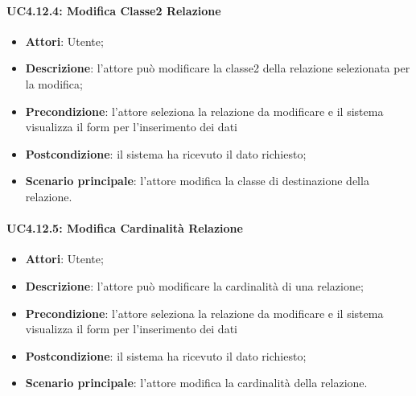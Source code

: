 \paragraph{UC4.12.4: Modifica Classe2 Relazione}
\label{UC4.12.4}
\begin{itemize}
	\item \textbf{Attori}: Utente;
	\item \textbf{Descrizione}: l'attore può modificare la classe2 della relazione selezionata per la modifica;
	\item \textbf{Precondizione}: l'attore seleziona la relazione da modificare e il sistema visualizza il form per l'inserimento dei dati
	\item \textbf{Postcondizione}: il sistema ha ricevuto il dato richiesto;
	\item \textbf{Scenario principale}: l'attore modifica la classe di destinazione della relazione.
\end{itemize}

\paragraph{UC4.12.5: Modifica Cardinalità Relazione}
\label{UC4.12.5}
\begin{itemize}
	\item \textbf{Attori}: Utente;
	\item \textbf{Descrizione}: l'attore può modificare la cardinalità di una relazione;
	\item \textbf{Precondizione}: l'attore seleziona la relazione da modificare e il sistema visualizza il form per l'inserimento dei dati
	\item \textbf{Postcondizione}: il sistema ha ricevuto il dato richiesto;
	\item \textbf{Scenario principale}: l'attore modifica la cardinalità della relazione.
\end{itemize}

